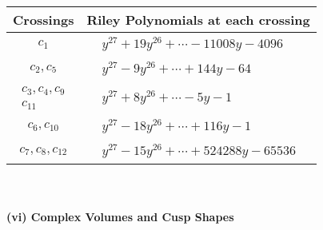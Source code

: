 \documentclass[1p]{elsarticle_modified}
\theoremstyle{definition}
\begin{document}
\begin{tabular}{m{50pt}|m{274pt}}
Crossings & \hspace{64pt}Riley Polynomials at each crossing \\
\hline $$\begin{aligned}c_{1}\end{aligned}$$&$\begin{aligned}
&y^{27}+19 y^{26}+\cdots-11008 y-4096
\end{aligned}$\\
\hline $$\begin{aligned}c_{2},c_{5}\end{aligned}$$&$\begin{aligned}
&y^{27}-9 y^{26}+\cdots+144 y-64
\end{aligned}$\\
\hline $$\begin{aligned}c_{3},c_{4},c_{9}\\c_{11}\end{aligned}$$&$\begin{aligned}
&y^{27}+8 y^{26}+\cdots-5 y-1
\end{aligned}$\\
\hline $$\begin{aligned}c_{6},c_{10}\end{aligned}$$&$\begin{aligned}
&y^{27}-18 y^{26}+\cdots+116 y-1
\end{aligned}$\\
\hline $$\begin{aligned}c_{7},c_{8},c_{12}\end{aligned}$$&$\begin{aligned}
&y^{27}-15 y^{26}+\cdots+524288 y-65536
\end{aligned}$\\
\hline
\end{tabular}\\~\\
\newpage\flushleft \textbf{(vi) Complex Volumes and Cusp Shapes}
\end{document}
